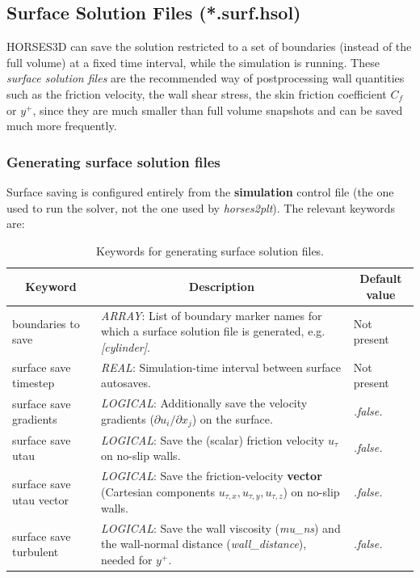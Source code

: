 \documentclass[a4paper,10pt]{report}
\begin{document}
\subsection{Surface Solution Files (*.surf.hsol)} \label{PostProc:surfhsol}

HORSES3D can save the solution restricted to a set of boundaries (instead of the full volume) at a fixed time interval, while the simulation is running. These \textit{surface solution files} are the recommended way of postprocessing wall quantities such as the friction velocity, the wall shear stress, the skin friction coefficient $C_f$ or $y^+$, since they are much smaller than full volume snapshots and can be saved much more frequently.

\subsubsection{Generating surface solution files}

Surface saving is configured entirely from the \textbf{simulation} control file (the one used to run the solver, not the one used by \textit{horses2plt}). The relevant keywords are:

\begin{longtable}{|p{4cm}|p{10cm}|p{2.2cm}|}
\caption{Keywords for generating surface solution files.} \label{tab:surfacesave} \\
\hline
\multicolumn{1}{|c|}{\textbf{Keyword}} & \multicolumn{1}{c|}{\textbf{Description}} & \multicolumn{1}{c|}{\textbf{Default value}} \\ \hline
\endfirsthead

boundaries to save 	& \textit{ARRAY}: List of boundary marker names for which a surface solution file is generated, e.g. \textit{[cylinder]}. & Not present \\ \hline

surface save timestep 	& \textit{REAL}: Simulation-time interval between surface autosaves. & Not present \\ \hline

surface save gradients 	& \textit{LOGICAL}: Additionally save the velocity gradients ($\partial u_i/\partial x_j$) on the surface. & \textit{.false.} \\ \hline

surface save utau 	& \textit{LOGICAL}: Save the (scalar) friction velocity $u_\tau$ on no-slip walls. & \textit{.false.} \\ \hline

surface save utau vector 	& \textit{LOGICAL}: Save the friction-velocity \textbf{vector} (Cartesian components $u_{\tau,x}, u_{\tau,y}, u_{\tau,z}$) on no-slip walls. & \textit{.false.} \\ \hline

surface save turbulent 	& \textit{LOGICAL}: Save the wall viscosity (\textit{mu\_ns}) and the wall-normal distance (\textit{wall\_distance}), needed for $y^+$. & \textit{.false.} \\ \hline
\end{longtable}
\end{document}
